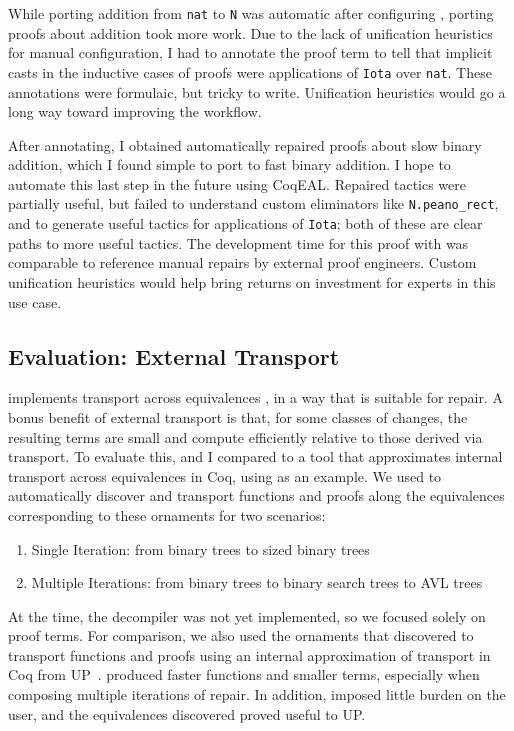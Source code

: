 While porting addition from \lstinline{nat} to \lstinline{N} was automatic after configuring \toolnamec,
porting proofs about addition took more work.
Due to the lack of unification heuristics for manual configuration,
I had to annotate the proof term to tell \toolnamec that implicit casts in the inductive cases of proofs were applications of \lstinline{Iota}
over \lstinline{nat}.
These annotations were formulaic, but tricky to write.
Unification heuristics would go a long way toward improving the workflow. %

After annotating, I obtained automatically repaired proofs about slow binary addition,
which I found simple to port to fast binary addition.
I hope to automate this last step in the future using CoqEAL. %
Repaired tactics were partially useful, but failed to understand custom eliminators like \lstinline{N.peano_rect}, and to generate useful
tactics for applications of \lstinline{Iota}; both of these are clear paths to more useful tactics.
The development time for this proof with \toolnamec was comparable to reference manual repairs by external proof engineers.
Custom unification heuristics would help bring returns on investment for experts in this use case.

\subsection{Evaluation: External Transport}
\label{sec:eval}

\toolnamec implements transport across equivalences , in a way that is suitable for repair.
A bonus benefit of external transport is that, for some classes of changes,
the resulting terms are small and compute efficiently relative to those derived via  transport.
To evaluate this,  and I compared \toolnamec to a tool that approximates internal transport across equivalences in Coq,
using  as an example.
We used \toolnamec to automatically discover and transport functions and proofs along the equivalences
corresponding to these ornaments for two scenarios:

\begin{enumerate}
\item Single Iteration: from binary trees to sized binary trees
\item Multiple Iterations: from binary trees to binary search trees to AVL trees
\end{enumerate}
At the time, the decompiler was not yet implemented, so we focused solely on proof terms.
For comparison, we also used the ornaments that \toolnamec discovered to transport functions
and proofs using an internal approximation of transport in Coq from UP~\cite{tabareau2017equivalences}.
\toolnamec produced faster functions and smaller terms, especially when composing multiple iterations of repair.
In addition, \toolnamec imposed little burden on the user, and the equivalences \toolnamec discovered proved useful to UP.

